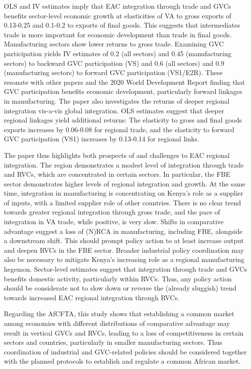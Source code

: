 \documentclass[a4paper]{article}
\begin{document}
OLS and IV estimates imply that EAC integration through trade and GVCs benefits sector-level economic growth at elasticities of VA to gross exports of 0.13-0.25 and 0.1-0.2 to exports of final goods. This suggests that intermediates trade is more important for economic development than trade in final goods. Manufacturing sectors show lower returns to gross trade. Examining GVC participation yields IV estimates of 0.2 (all sectors) and 0.45 (manufacturing sectors) to backward GVC participation (VS) and 0.6 (all sectors) and 0.9 (manufacturing sectors) to forward GVC participation (VS1/E2R). These resonate with other papers and the 2020 World Development Report finding that GVC participation benefits economic development, particularly forward linkages in manufacturing. The paper also investigates the returns of deeper regional integration vis-a-vis global integration. OLS estimates suggest that deeper regional linkages yield additional returns: The elasticity to gross and final goods exports increases by 0.06-0.08 for regional trade, and the elasticity to forward GVC participation (VS1) increases by 0.13-0.14 for regional links.  \newline 

The paper thus highlights both prospects of and challenges to EAC regional integration. The region demonstrates a modest level of integration through trade and RVCs, which are concentrated in certain sectors. In particular, the FBE sector demonstrates higher levels of regional integration and growth. At the same time, integration in manufacturing is concentrating on Kenya's role as a supplier of inputs, with a limited supplier role of other countries. There is no clear trend towards greater regional integration through gross trade, and the pace of integration in VA trade, while positive, is very slow. Shifts in comparative advantage suggest a loss of (N)RCA in manufacturing, including FBE, alongside a downstream shift. This should prompt policy action to at least increase output and deepen RVCs in the FBE sector. Broader industrial policy coordination may also be necessary to mitigate Kenya's increasing role as a regional manufacturing hegemon. Sector-level estimates suggest that integration through trade and GVCs benefits domestic activity, particularly within RVCs. Thus, any policy action should be considerate not to slow down or reverse the (already sluggish) trend towards increased EAC regional integration through RVCs. \newline 

Regarding the AfCFTA, this study shows that establishing a common market among economies with different distributions of comparative advantage may result in vertical GVCs and RVCs, leading to a loss of competitiveness in certain sectors and countries, particularly in smaller manufacturing sectors. Thus coordination of industrial and GVC-related policies should be considered together with the planned protocols to establish and regulate a common African market. 
\end{document}
